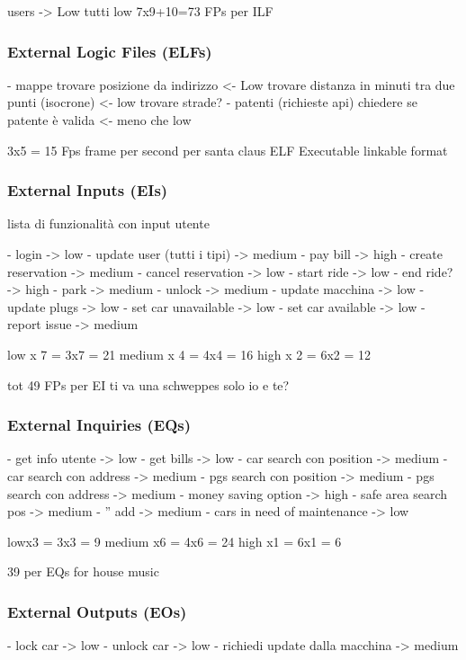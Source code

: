 \documentclass[english]{article}
\begin{document}
users -> Low
tutti low
7x9+10=73 FPs per ILF

\subsubsection{External Logic Files (ELFs)}

- mappe
trovare posizione da indirizzo <- Low
trovare distanza in minuti tra due punti (isocrone) <- low
trovare strade?
- patenti (richieste api)
chiedere se patente è valida <- meno che low

3x5 = 15 Fps frame per second per santa claus ELF Executable linkable format

\subsubsection{External Inputs (EIs)}

lista di funzionalità con input utente

- login -> low
- update user (tutti i tipi) -> medium
- pay bill -> high
- create reservation -> medium
- cancel reservation -> low
- start ride -> low
- end ride? -> high
- park -> medium 
- unlock -> medium
- update macchina -> low
- update plugs -> low
- set car unavailable -> low
- set car available -> low
- report issue -> medium

low x 7 = 3x7 = 21
medium x 4 = 4x4 = 16
high x 2 = 6x2 = 12

tot 49 FPs per EI ti va una schweppes solo io e te?


\subsubsection{External Inquiries (EQs)}

- get info utente -> low
- get bills -> low
- car search con position -> medium
- car search con address -> medium
- pgs search con position -> medium
- pgs search con address -> medium
- money saving option -> high
- safe area search pos -> medium
- '' add -> medium
- cars in need of maintenance -> low

lowx3 = 3x3 = 9
medium x6 = 4x6 = 24
high x1 = 6x1 = 6

39 per EQs for house music

\subsubsection{External Outputs (EOs)}

- lock car -> low
- unlock car -> low
- richiedi update dalla macchina -> medium
\end{document}

